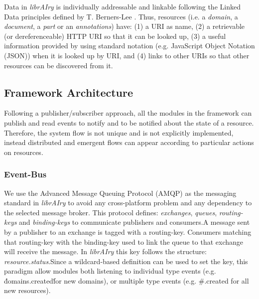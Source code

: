 Data in \textit{librAIry} is individually addressable and linkable \cite{Turchi2012a} following the Linked Data principles defined by T. Berners-Lee \cite{Bizer2009}. Thus, resources (i.e. a \textit{domain}, a \textit{document}, a \textit{part} or an \textit{annotations}) have:
(1) a URI as name, (2) a retrievable (or dereferenceable) HTTP URI so that it can be looked up, (3) a useful information provided by using standard notation (e.g. JavaScript Object Notation (JSON)) when it is  looked up by URI, and (4) links to other URIs so that other resources can be discovered from it.

\subsection{Framework Architecture}

Following a publisher/subscriber approach, all the modules in the framework can publish and read events to notify and to be notified about the state of a resource. 
Therefore, the system flow is not unique and is not explicitly implemented, instead distributed and emergent flows can appear according to particular actions on resources.

\subsubsection{Event-Bus}

We use the Advanced Message Queuing Protocol (AMQP) as the messaging standard in \textit{librAIry} to avoid any cross-platform problem and any dependency to the selected message broker. This protocol defines: \textit{exchanges}, \textit{queues}, \textit{routing-keys} and \textit{binding-keys} to communicate publishers and consumers.A message sent by a publisher to an exchange is tagged with a routing-key. Consumers matching that routing-key with the binding-key used to link the queue to that exchange will receive the message. In \textit{librAIry} this key follows the structure: \textit{resource.status}.Since a wildcard-based definition can be used to set the key, this paradigm allow modules both listening to individual type events (e.g. \'domains.created\' for new domains), or multiple type events (e.g. \#.created for all new resources).

